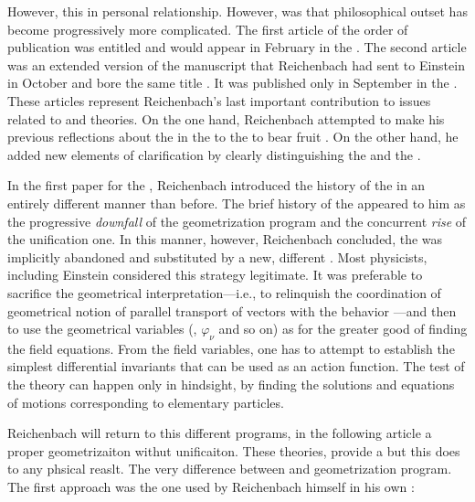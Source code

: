 \documentclass[draft]{article}
\newcommand{\PRZL}{\citetitle{Reichenbach1928}\xspace}
\begin{document}
However, this in personal relationship. However, was that philosophical outset has become progressively more complicated. The first article of the order of publication was entitled  \citep{Reichenbach1929b} and would appear in February in the . The second article was an extended version of the manuscript that Reichenbach had sent to Einstein in October and bore the same title  \citep{Reichenbach1929a}. It was published only in September in the . These articles represent Reichenbach's last important contribution to issues related to \rt and \spti theories. On the one hand, Reichenbach attempted to make his previous reflections about the \uftp in the \Ap to the \PRZL to bear fruit \citep[\S46]{Reichenbach1928}. On the other hand, he added new elements of clarification by clearly distinguishing the  and the .

In the first paper for the , Reichenbach introduced the history of the \uft in an entirely different manner than before. The brief history of the \uftp appeared to him as the progressive \emph{downfall} of the geometrization program and the concurrent \emph{rise} of the unification one.  In this manner, however, Reichenbach concluded, the  was implicitly abandoned and substituted by a new, different . Most physicists, including Einstein  considered this strategy legitimate. It was preferable to sacrifice the geometrical interpretation---i.e., to relinquish the coordination of geometrical notion of parallel transport of vectors with the behavior \rac---and then to use the geometrical variables (\Gtmn, $\varphi_\nu$ and so on) as  for the greater good of finding the field equations. From the field variables, one has to attempt to establish the simplest differential invariants that can be used as an action function. The test of the theory can happen only in hindsight, by finding the solutions and equations of motions corresponding to elementary particles.

Reichenbach will return to this different programs, in the following article a proper geometrizaiton withut unificaiton. These theories, provide a but this does to any phsical reaslt. The very difference between and geometrization program. The first approach was the one used by Reichenbach himself in his own :
\end{document}
